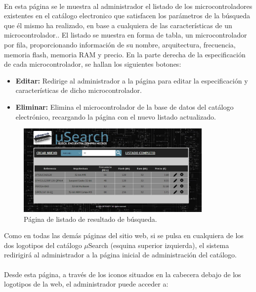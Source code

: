 \paragraph{}En esta página se le muestra al administrador el listado de los microcontroladores existentes en el catálogo electronico que satisfacen los parámetros de la búsqueda que él mismo ha realizado, en base a cualquiera de las características de un microcontrolador.. El listado se muestra en forma de tabla, un microcontrolador por fila, proporcionando información de su nombre, arquitectura, frecuencia, memoria flash, memoria RAM y precio. En la parte derecha de la especificación de cada microcontrolador, se hallan los siguientes botones:
\begin{itemize}
	\item \textbf{Editar:} Redirige al administrador a la página para editar la especificación y características de dicho microcontrolador.
	\item \textbf{Eliminar:} Elimina el microcontrolador de la base de datos del catálogo electrónico, recargando la página con el nuevo listado actualizado.
\end{itemize}

\begin{figure}[h!]
	\centering
	\includegraphics[width=0.85\textwidth]{img/listado_busqueda_admin}
	\caption{Página de listado de resultado de búsqueda.}
	\label{fig:listado_busqueda_admin}
\end{figure}

Como en todas las demás páginas del sitio web, si se pulsa en cualquiera de los dos logotipos del catálogo $\mu$Search (esquina superior izquierda), el sistema redirigirá al administrador a la página inicial de administración del catálogo.

\paragraph{}Desde esta página, a través de los iconos situados en la cabecera debajo de los logotipos de la web, el administrador puede acceder a:


